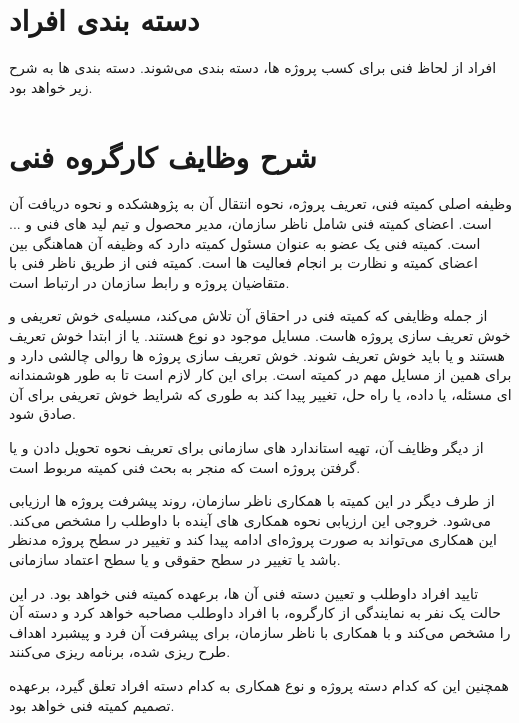 \section{دسته بندی افراد}

افراد از لحاظ فنی برای کسب پروژه ها، دسته بندی می‌شوند. دسته بندی ها به شرح زیر خواهد بود.













\section{شرح وظایف کارگروه فنی}

وظیفه اصلی کمیته فنی، تعریف پروژه، نحوه انتقال آن به پژوهشکده و نحوه دریافت آن است. اعضای کمیته فنی شامل ناظر سازمان، مدیر محصول و تیم لید های فنی و ... است. کمیته فنی یک عضو به عنوان مسئول کمیته دارد که وظیفه آن هماهنگی بین اعضای کمیته و نظارت بر انجام فعالیت ها است. کمیته فنی از طریق ناظر فنی با متقاضیان پروژه و رابط سازمان در ارتباط است.

از جمله وظایفی که کمیته فنی در احقاق آن تلاش می‌کند، مسیله‌ی خوش تعریفی و خوش تعریف سازی پروژه هاست. مسایل موجود دو نوع هستند. یا از ابتدا خوش تعریف هستند و یا باید خوش تعریف شوند. خوش تعریف سازی پروژه ها روالی چالشی دارد و برای همین از مسایل مهم در کمیته است.
برای این کار لازم است تا به طور هوشمندانه ای مسئله، یا داده، یا راه حل، تغییر پیدا کند به طوری که شرایط خوش تعریفی برای آن صادق شود.

از دیگر وظایف آن، تهیه استاندارد های سازمانی برای تعریف نحوه تحویل دادن و یا گرفتن پروژه است که منجر به بحث فنی کمیته مربوط است.

از طرف دیگر  در این کمیته با همکاری ناظر سازمان، روند پیشرفت پروژه ها ارزیابی می‌شود. خروجی این ارزیابی نحوه همکاری های آینده با داوطلب را مشخص می‌کند. این همکاری می‌تواند به صورت پروژه‌ای ادامه پیدا کند و تغییر در سطح پروژه مدنظر باشد یا تغییر در سطح حقوقی و یا سطح اعتماد سازمانی.

تایید افراد داوطلب و تعیین دسته فنی آن ها، برعهده کمیته فنی خواهد بود. در این حالت یک نفر به نمایندگی از کارگروه، با افراد داوطلب مصاحبه خواهد کرد و دسته آن را مشخص می‌کند و با همکاری با ناظر سازمان، برای پیشرفت آن فرد و پیشبرد اهداف طرح ریزی شده، برنامه ریزی می‌کنند.

همچنین این که کدام دسته پروژه و نوع همکاری به کدام دسته افراد تعلق گیرد، برعهده تصمیم کمیته فنی خواهد بود.








































